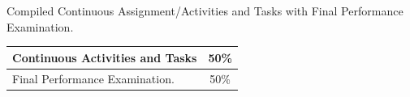 Compiled Continuous  Assignment/Activities and Tasks  with Final Performance Examination.

\subtitle{Grading System}
\begin{center}
{\renewcommand\arraystretch{1.5}
\begin{tabular}{|l|c|}\hline
Continuous Activities and Tasks  &  50\%\\\hline
Final Performance Examination. &  50\%\\\hline
\end{tabular}
}
\end{center}














 







